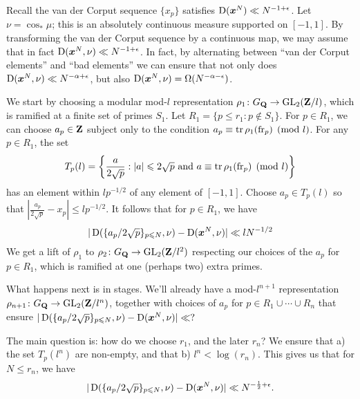Recall the van der Corput sequence $\{x_p\}$ satisfies 
$\operatorname{D}({\boldsymbol x}^N) \ll N^{-1+\epsilon}$. Let $\nu = \cos_\ast \mu$; this is an 
absolutely continuous measure supported on $[-1,1]$. By transforming the 
van der Corput sequence by a continuous map, we may assume that in fact 
$\operatorname{D}({\boldsymbol x}^N,\nu) \ll N^{-1+\epsilon}$. In fact, by alternating between 
``van der Corput elements'' and ``bad elements'' we can ensure that not 
only does $\operatorname{D}({\boldsymbol x}^N,\nu) \ll N^{-\alpha+\epsilon}$, but also 
$\operatorname{D}({\boldsymbol x}^N,\nu) = \Omega(N^{-\alpha-\epsilon})$. 

We start by choosing a modular mod-$l$ representation 
$\rho_1\colon G_{\mathbf{Q}} \to \operatorname{GL}_2(\mathbf{Z}/l)$, which is ramified at a finite set of 
primes $S_1$. Let $R_1 = \{p\leqslant r_1 : p \notin S_1\}$. For $p\in R_1$, 
we can choose $a_p\in \mathbf{Z}$ subject only to the condition 
$a_p \equiv \operatorname{tr} \rho_1(\mathrm{fr}_p)\pmod l$. For any $p\in R_1$, the set 
\[
	T_p(l) = \left\{\frac{a}{2\sqrt p} : |a| \leqslant 2\sqrt p\text{ and }a\equiv \operatorname{tr} \rho_1(\mathrm{fr}_p)\pmod l\right\}
\]
has an element within $l p^{-1/2}$ of any element of $[-1,1]$. Choose 
$a_p\in T_p(l)$ so that 
$\left|\frac{a_p}{2\sqrt p} - x_p\right| \leqslant l p^{-1/2}$. It follows 
that for $p\in R_1$, we have 
\[
	|\operatorname{D}(\{a_p/2\sqrt p\}_{p\leqslant N}, \nu) - \operatorname{D}({\boldsymbol x}^N,\nu)| \ll l N^{-1/2}
\]
We get a lift of $\rho_1$ to $\rho_2\colon G_{\mathbf{Q}} \to \operatorname{GL}_2(\mathbf{Z}/l^2)$ respecting 
our choices of the $a_p$ for $p\in R_1$, which is ramified at one (perhaps two) 
extra primes. 


What happens next is in stages. We'll already have a mod-$l^{n+1}$ 
representation $\rho_{n+1}\colon G_{\mathbf{Q}} \to \operatorname{GL}_2(\mathbf{Z}/l^n)$, together with 
choices of $a_p$ for $p\in R_1\cup \cdots \cup R_n$ that ensure 
$|\operatorname{D}(\{a_p / 2\sqrt p\}_{p\leqslant N}, \nu) - \operatorname{D}({\boldsymbol x}^N,\nu)| \ll ?$


The main question is: how do we choose $r_1$, and the later $r_n$? We ensure 
that a) the set $T_p(l^n)$ are non-empty, and that b) $l^n < \log(r_n)$. This 
gives us that for $N\leqslant r_n$, we have 
\[
	|\operatorname{D}(\{a_p / 2\sqrt p\}_{p\leqslant N}, \nu) - \operatorname{D}({\boldsymbol x}^N,\nu)| \ll N^{-\frac 1 2+\epsilon} .
\]
